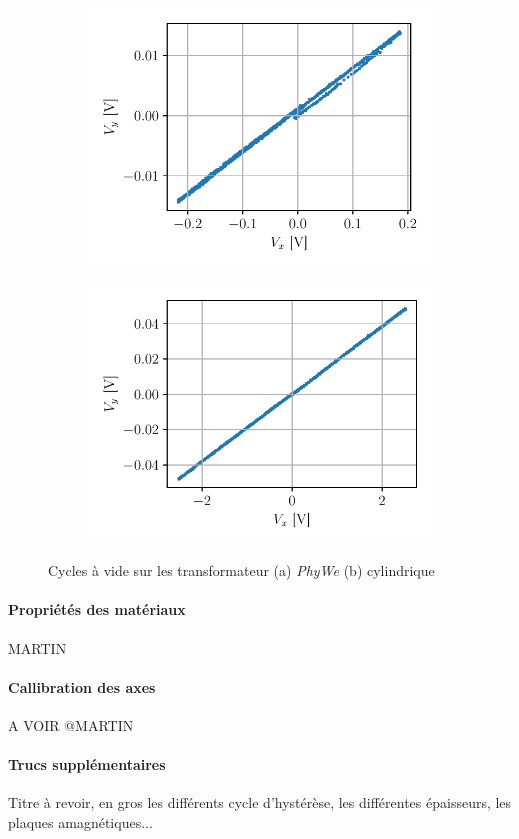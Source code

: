 \begin{figure}[h]
    \centering
    \begin{subfigure}{0.5\linewidth}
        \centering
        \includegraphics[width=\linewidth]{figures/G1-phywe-vide.pdf}
        \caption{}
        \label{fig:phywe_vide}
    \end{subfigure}%
    \begin{subfigure}{0.5\linewidth}
        \centering
        \includegraphics[width=\linewidth]{figures/G1-cylindre-vide.pdf}
        \caption{}
        \label{fig:cylindre_vide}
    \end{subfigure}
    \caption{Cycles à vide sur les transformateur (a) \textit{PhyWe} (b) cylindrique}
\end{figure}

\paragraph{Propriétés des matériaux}
MARTIN

\paragraph{Callibration des axes}
A VOIR @MARTIN

\paragraph{Trucs supplémentaires}
Titre à revoir, en gros les différents cycle d'hystérèse, les différentes épaisseurs, les plaques amagnétiques...

